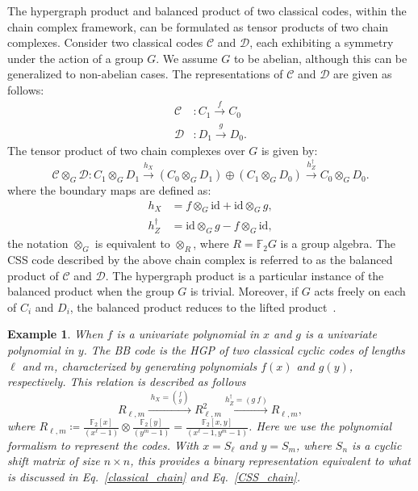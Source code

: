 \documentclass[aps,prl,english,superscriptaddress,twocolumn,tightenlines,showpacs,longbibliography,floatfix,amsfonts]{revtex4-2}
\newtheorem{ex}{Example}
\begin{document}
The hypergraph product and balanced product of two classical codes, within the chain complex framework, can be formulated as tensor products of two chain complexes.
Consider two classical codes $\mathcal{C}$ and $\mathcal{D}$, each exhibiting a symmetry under the action of a group $G$. We assume $G$ to be abelian,  although this can be generalized to non-abelian cases.
The representations of $\mathcal{C}$ and $\mathcal{D}$ are given as follows:
\begin{align}
	\mathcal{C} &: C_1 \overset{f}{\longrightarrow} C_0 \\
	\mathcal{D} &: D_1 \overset{g}{\longrightarrow} D_0.
\end{align}
The tensor product of two chain complexes over $G$ is given by:
\begin{equation}\label{BP_chain}
	\mathcal{C}\otimes_G\mathcal{D}: C_1\otimes_G D_1 \xrightarrow{h_X} (C_0\otimes_G D_1)\oplus
	(C_1\otimes_G D_0)\xrightarrow{h_Z^\dagger} C_0\otimes_G D_0.
\end{equation}
where the boundary maps are defined as:
\begin{align}
	h_X &= f \otimes_G \text{id} + \text{id} \otimes_G g,\\
	h_Z^\dagger &=\text{id} \otimes_G g - f \otimes_G \text{id},
\end{align}
the notation $\otimes_G$ is equivalent to $\otimes_R$, where $R=\mathbb{F}_2G$ is a group algebra. The CSS code described by the above chain complex is referred to as the balanced product of $\mathcal{C}$ and $\mathcal{D}$. The hypergraph product is a particular instance of the balanced product when the group $G$ is trivial. Moreover, if $G$ acts freely on each of $C_i$ and $D_i$, the balanced product reduces to the lifted product~\cite{Breuckmann21a}.
\begin{ex}
	When $f$ is a univariate polynomial in $x$ and $g$ is a univariate polynomial in $y$. The BB code is the HGP of two classical cyclic codes of lengths $\ell$ and $m$, characterized by generating polynomials $f(x)$ and $g(y)$, respectively. This relation is described as follows
	\begin{equation}
		R_{\ell,m}\xrightarrow{\; h_{X}={f \choose g}\;}R_{\ell,m}^{2}\xrightarrow{h_{Z}^{\dagger}=\left(g\ f\right)}R_{\ell,m},
	\end{equation} 
	where $R_{\ell,m} \coloneqq \frac{\mathbb{F}_2[x]}{(x^\ell-1)} \otimes \frac{\mathbb{F}_2[y]}{(y^m-1)} = \frac{\mathbb{F}_2[x,y]}{(x^{\ell}-1, y^m-1)}$.
	Here we use the polynomial formalism to represent the codes. With $x=S_\ell$ and $y=S_m$, where $S_n$ is a cyclic shift matrix of size $n\times n$, this provides a binary representation equivalent to what is discussed in Eq.~\eqref{classical_chain} and Eq.~\eqref{CSS_chain}.
\end{ex}
\end{document}
